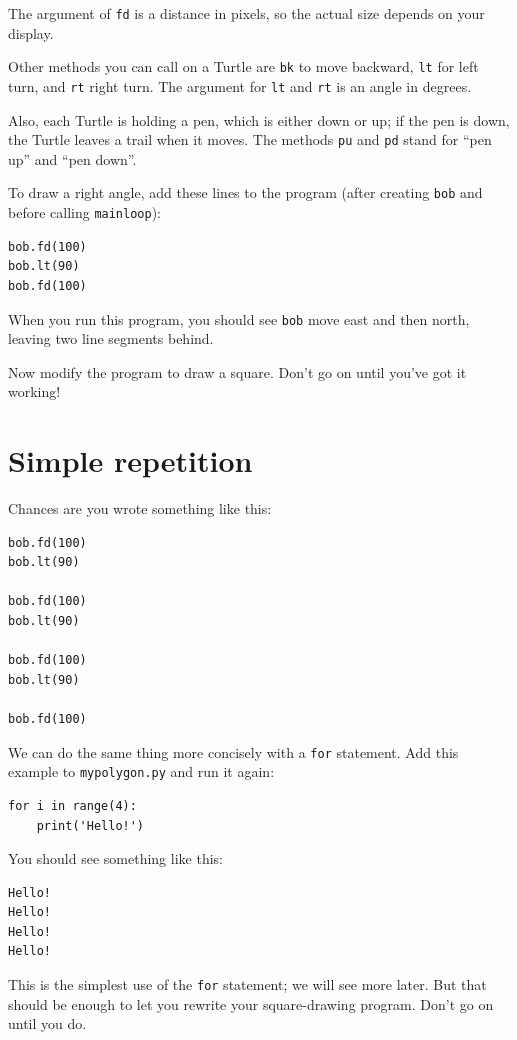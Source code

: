 \documentclass[10pt]{book}
\begin{document}
The argument of {\tt fd} is a distance in pixels, so the actual
size depends on your display.

Other methods you can call on a Turtle are {\tt bk} to move
backward, {\tt lt} for left turn, and {\tt rt} right turn.  The
argument for {\tt lt} and {\tt rt} is an angle in degrees.

Also, each Turtle is holding a pen, which is
either down or up; if the pen is down, the Turtle leaves
a trail when it moves.  The methods {\tt pu} and {\tt pd}
stand for ``pen up'' and ``pen down''.

To draw a right angle, add these lines to the program
(after creating {\tt bob} and before calling \verb"mainloop"):

\begin{verbatim}
bob.fd(100)
bob.lt(90)
bob.fd(100)
\end{verbatim}
%
When you run this program, you should see {\tt bob} move east and then
north, leaving two line segments behind.

Now modify the program to draw a square.  Don't go on until
you've got it working!


\section{Simple repetition}
\label{repetition}

Chances are you wrote something like this:

\begin{verbatim}
bob.fd(100)
bob.lt(90)

bob.fd(100)
bob.lt(90)

bob.fd(100)
bob.lt(90)

bob.fd(100)
\end{verbatim}
%
We can do the same thing more concisely with a {\tt for} statement.
Add this example to {\tt mypolygon.py} and run it again:

\begin{verbatim}
for i in range(4):
    print('Hello!')
\end{verbatim}
%
You should see something like this:

\begin{verbatim}
Hello!
Hello!
Hello!
Hello!
\end{verbatim}
%
This is the simplest use of the {\tt for} statement; we will see
more later.  But that should be enough to let you rewrite your
square-drawing program.  Don't go on until you do.
\end{document}
